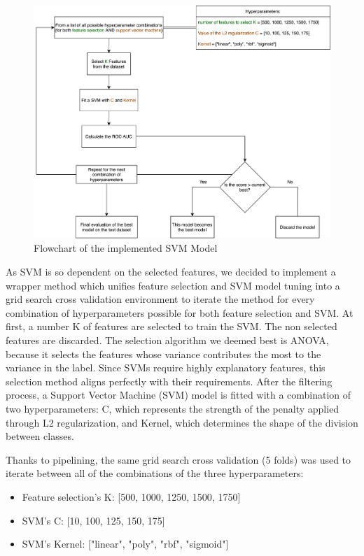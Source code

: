 \documentclass{article}
\begin{document}
\begin{figure}[h]
	\centering
	\includegraphics[width=1.0\textwidth]{FlowChart.png}
	 \vspace{0em}
	\caption{Flowchart of the implemented SVM Model}
    \label{fig:Flowchart of the implemented SVM Model}
    
\end{figure}

As SVM is so dependent on the selected features, we decided to implement a wrapper method which unifies feature selection and SVM model tuning into a grid search cross validation environment to iterate the method for every combination of hyperparameters possible for both feature selection and SVM. At first, a number K of features are selected to train the SVM. The non selected features are discarded. The selection algorithm we deemed best is ANOVA, because it selects the features whose variance contributes the most to the variance in the label. Since SVMs require highly explanatory features, this selection method aligns perfectly with their requirements. After the filtering process, a Support Vector Machine (SVM) model is fitted with a combination of two hyperparameters: C, which represents the strength of the penalty applied through L2 regularization, and Kernel, which determines the shape of the division between classes.

Thanks to pipelining, the same grid search cross validation (5 folds) was used to iterate between all of the combinations of the three hyperparameters:
 
\begin{itemize}
  \item Feature selection's K: [500, 1000, 1250, 1500, 1750]
  \item SVM's C: [10, 100, 125, 150, 175]
  \item SVM's Kernel: ["linear", "poly", "rbf", "sigmoid"]
\end{itemize}
\end{document}
